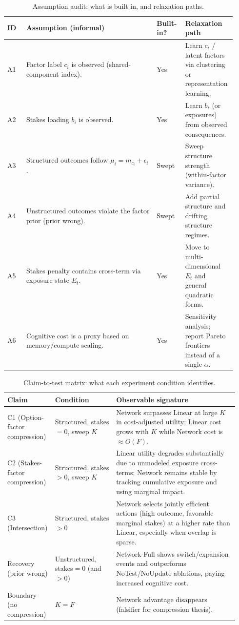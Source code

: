 \documentclass[11pt]{article}
\begin{document}
\begin{table}[t]
\caption{Assumption audit: what is built in, and relaxation paths.}
\label{tab:assumption_audit}
\centering
\begin{tabular}{p{0.08\linewidth} p{0.55\linewidth} p{0.12\linewidth} p{0.18\linewidth}}
\toprule
ID & Assumption (informal) & Built-in? & Relaxation path \\
\midrule
A1 & Factor label $c_i$ is observed (shared-component index). & Yes & Learn $c_i$ / latent factors via clustering or representation learning. \\
A2 & Stakes loading $b_i$ is observed. & Yes & Learn $b_i$ (or exposures) from observed consequences. \\
A3 & Structured outcomes follow $\mu_i=m_{c_i}+\epsilon_i$. & Swept & Sweep structure strength (within-factor variance). \\
A4 & Unstructured outcomes violate the factor prior (prior wrong). & Swept & Add partial structure and drifting structure regimes. \\
A5 & Stakes penalty contains cross-term via exposure state $E_t$. & Yes & Move to multi-dimensional $E_t$ and general quadratic forms. \\
A6 & Cognitive cost is a proxy based on memory/compute scaling. & Yes & Sensitivity analysis; report Pareto frontiers instead of a single $\alpha$. \\
\bottomrule
\end{tabular}
\end{table}

\begin{table}[t]
\caption{Claim-to-test matrix: what each experiment condition identifies.}
\label{tab:claim_matrix}
\centering
\begin{tabular}{p{0.16\linewidth} p{0.26\linewidth} p{0.52\linewidth}}
\toprule
Claim & Condition & Observable signature \\
\midrule
C1 (Option-factor compression) & Structured, stakes$=0$, sweep $K$ & Network surpasses Linear at large $K$ in cost-adjusted utility; Linear cost grows with $K$ while Network cost is $\approx O(F)$. \\
C2 (Stakes-factor compression) & Structured, stakes$>0$, sweep $K$ & Linear utility degrades substantially due to unmodeled exposure cross-terms; Network remains stable by tracking cumulative exposure and using marginal impact. \\
C3 (Intersection) & Structured, stakes$>0$ & Network selects jointly efficient actions (high outcome, favorable marginal stakes) at a higher rate than Linear, especially when overlap is sparse. \\
Recovery (prior wrong) & Unstructured, stakes$=0$ (and $>0$) & Network-Full shows switch/expansion events and outperforms NoTest/NoUpdate ablations, paying increased cognitive cost. \\
Boundary (no compression) & $K=F$ & Network advantage disappears (falsifier for compression thesis). \\
\bottomrule
\end{tabular}
\end{table}
\end{document}
